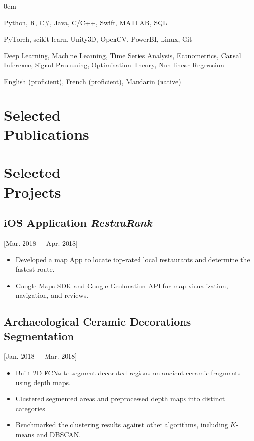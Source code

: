 \documentclass{mycv}
\begin{document}
\begin{description}
  \itemsep 0em
  \item[Programming:] Python, R, C\#, Java, C/C++, Swift, MATLAB, SQL
  \item[Frameworks \& Tools:] PyTorch, scikit-learn, Unity3D, OpenCV, PowerBI, Linux, Git
  \item[Skills \& Expertise:] Deep Learning, Machine Learning, Time Series Analysis, Econometrics, Causal Inference, Signal Processing, Optimization Theory, Non-linear Regression
  \item[Languages:] English (proficient), French (proficient), Mandarin (native)
\end{description}

\section{Selected \\ Publications}

\vspace{-0.5em}
\section{Selected \\ Projects}

\subsection{iOS Application \textit{RestauRank}}[Mar. 2018~--~Apr. 2018]

\begin{itemize}
  \itemsep 0em
  \item Developed a map App to locate top-rated local restaurants and determine the fastest route.
  \item Google Maps SDK and Google Geolocation API for map visualization, navigation, and reviews.
\end{itemize}

\vspace{-0.5em}

\subsection{Archaeological Ceramic Decorations Segmentation}[Jan. 2018~--~Mar. 2018]

\begin{itemize}
  \itemsep 0em
    \item Built 2D FCNs to segment decorated regions on ancient ceramic fragments using depth maps.
    \item Clustered segmented areas and preprocessed depth maps into distinct categories.
    \item Benchmarked the clustering results against other algorithms, including $K$-means and DBSCAN.
\end{itemize}
\end{document}
